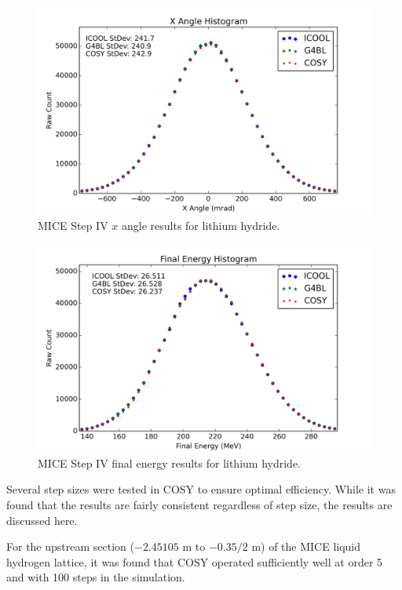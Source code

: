 \begin{figure}[H]
  \centering
    \includegraphics[width=\textwidth]{MICE data/LiH/px} 
  \caption{MICE Step IV $x$ angle results for lithium hydride.}
  \label{fig:mice_lih_xangle}
\end{figure}

\begin{figure}[H]
  \centering
    \includegraphics[width=\textwidth]{MICE data/LiH/e} 
  \caption{MICE Step IV final energy results for lithium hydride.}
  \label{fig:mice_lih_energy}
\end{figure}

\label{ssc:step_size_effects}
Several step sizes were tested in COSY to ensure optimal efficiency. While it was found that the results are fairly consistent regardless of step size, the results are discussed here.

For the upstream section ($-2.45105$ m to $-0.35/2$ m) of the MICE liquid hydrogen lattice, it was found that COSY operated sufficiently well at order 5 and with 100 steps in the simulation.

